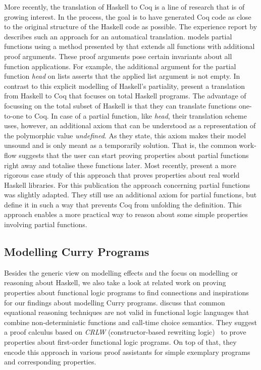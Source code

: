 More recently, the translation of Haskell to Coq is a line of research that is of growing interest.
In the process, the goal is to have generated Coq code as close to the original structure of the Haskell code as possible.
The experience report by \citet{dijkstra2012experimentation} describes such an approach for an automatical translation.
\citeauthor{dijkstra2012experimentation} models partial functions using a method presented by \citet{bove2007computation} that extends all functions with additional proof arguments.
These proof arguments pose certain invariants about all function applications.
For example, the additional argument for the partial function \emph{head} on lists asserts that the applied list argument is not empty.
In contrast to this explicit modelling of Haskell's partiality, \citet{spector-zabusky2018total} present a translation from Haskell to Coq that focuses on total Haskell programs.
The advantage of focussing on the total subset of Haskell is that they can translate functions one\--to\--one to Coq.
In case of a partial function, like \emph{head}, their translation scheme uses, however, an additional axiom that can be understood as a representation of the polymorphic value \emph{undefined}.
As they state, this axiom makes their model unsound and is only meant as a temporarily solution.
That is, the common work\--flow suggests that the user can start proving properties about partial functions right away and totalise these functions later.
Most recently, \citet{breitner2018ready} present a more rigorous case study of this approach that proves properties about real world Haskell libraries.
For this publication the approach concerning partial functions was slightly adapted.
They still use an additional axiom for partial functions, but define it in such a way that prevents Coq from unfolding the definition.
This approach enables a more practical way to reason about some simple properties involving partial functions.

\subsection{Modelling Curry Programs}

Besides the generic view on modelling effects and the focus on modelling or reasoning about Haskell, we also take a look at related work on proving properties about functional logic programs to find connections and inspirations for our findings about modelling Curry programs.
\citet{cleva2004logic} discuss that common equational reasoning techniques are not valid in functional logic languages that combine non\--deterministic functions and call\--time choice semantics.
They suggest a proof calculus based on \emph{CRLW} (constructor\--based rewriting logic)~\citep{gonzalez-moreno1996rewriting} to prove properties about first\--order functional logic programs.
On top of that, they encode this approach in various proof assistants for simple exemplary programs and corresponding properties.

